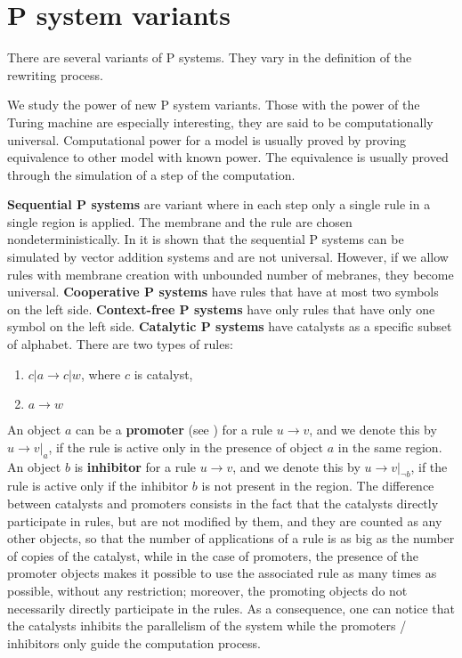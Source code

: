 \documentclass[llncs,submission,copyright,creativecommons]{../lib/lncs/llncs}
\begin{document}










\section{P system variants}
\label{sec:variants}

There are several variants of P systems. They vary in the definition of the rewriting process.

We study the power of new P system variants. Those with the power of the Turing machine are especially interesting, they are said to be computationally universal. Computational power for a model is usually proved by proving equivalence to other model with known power. The equivalence is usually proved through the simulation of a step of the computation.

{\bf Sequential P systems} are variant where in each step only a single rule in a single region is applied. The membrane and the rule are chosen nondeterministically. In \cite{Ibarra:2005:SPS:2111772.2111880} it is shown that the sequential P systems can be simulated by vector addition systems and are not universal. However, if we allow rules with membrane creation with unbounded number of mebranes, they become universal.
{\bf Cooperative P systems} have rules that have at most two symbols on the left side.
{\bf Context-free P systems} have only rules that have only one symbol on the left side.
{\bf Catalytic P systems} have catalysts as a specific subset of alphabet. There are two types of rules:

\begin{enumerate}
	\item $c|a\rightarrow c|w$, where $c$ is catalyst,
	\item $a\rightarrow w$
\end{enumerate}

An object $a$ can be a {\bf promoter} (see \cite{Ionescu:jucs_10_5:on_p_systems_with}) for a rule $u\rightarrow v$, and we denote this by $u\rightarrow v|_a$, if the rule is active only in the presence of object $a$ in the same region. An object $b$ is {\bf inhibitor} for a rule $u\rightarrow v$, and we denote this by $u\rightarrow v|_{\neg b}$, if the rule is active only if the inhibitor $b$ is not present in the region.
The difference between catalysts and promoters consists in the fact that the catalysts directly participate in rules, but are not modified by them, and they are counted as any other objects, so that the number of applications of a rule is as big as the number of copies of the catalyst, while in the case of promoters, the presence of the promoter objects makes it possible to use the associated rule as many times as possible, without any restriction; moreover, the promoting objects do not necessarily directly participate in the rules. As a consequence, one can notice that the catalysts inhibits the parallelism of the system while the promoters / inhibitors only guide the computation process.
\end{document}
